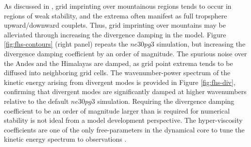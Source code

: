 \documentclass{agujournal}
\begin{document}
As discussed in \cite{HL2018MWR}, grid imprinting over mountainous regions tends to occur in regions of weak stability, and the extrema often  manifest as full tropsphere upward/downward couplets. Thus, grid imprinting over mountains may be alleviated through increasing the divergence damping in the model. Figure \ref{fig:fhs-contours} (right panel) repeats the $ne30pg3$ simulation, but increasing the divergence damping coefficient by an order of magnitude. The spurious noise over the Andes and the Himalayas are damped, as grid point extrema tends to be diffused into neighboring grid cells. The wavenumber-power spectrum of the kinetic energy arising from divergent modes is provided in Figure \ref{fig:fhs-div}, confirming that divergent modes are significantly damped at higher wavenumbers relative to the default $ne30pg3$ simulation. Requiring the divergence damping coefficient to be an order of magnitude larger than is required for numerical stability is not ideal from a model development perspective. The hyper-viscosity coefficients are one of the only free-parameters in the dynamical core to tune the kinetic energy spectrum to observations \citep{SPKS2014JAS,LetAl2018JAMES}.
\end{document}
